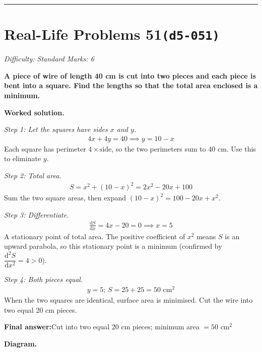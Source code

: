 \documentclass[11pt]{article}
\newcommand{\question}[1]{\par\medskip\noindent\textbf{#1}\par}
\begin{document}
\medskip\hrule

\section*{Real-Life Problems 51\quad\small\texttt{(d5-051)}}
\textit{Difficulty: Standard \quad\textbar\quad Marks: 6}

\question{A piece of wire of length 40 cm is cut into two pieces and each piece is bent into a square. Find the lengths so that the total area enclosed is a minimum.}

\textbf{Worked solution.}

\textit{Step 1: Let the squares have sides \( x \) and \( y \).}
\[\begin{gathered}
4x + 4y = 40 \implies y = 10 - x
\end{gathered}\]
Each square has perimeter \( 4 \times \text{side} \), so the two perimeters sum to 40 cm. Use this to eliminate \( y \).

\textit{Step 2: Total area.}
\[\begin{gathered}
S = x^2 + (10 - x)^2 = 2x^2 - 20x + 100
\end{gathered}\]
Sum the two square areas, then expand \( (10-x)^2 = 100 - 20x + x^2 \).

\textit{Step 3: Differentiate.}
\[\begin{gathered}
\frac{\mathrm{d}S}{\mathrm{d}x} = 4x - 20 = 0 \implies x = 5
\end{gathered}\]
A stationary point of total area. The positive coefficient of \( x^2 \) means \( S \) is an upward parabola, so this stationary point is a minimum (confirmed by \( \dfrac{\mathrm{d}^2 S}{\mathrm{d}x^2} = 4 > 0 \)).

\textit{Step 4: Both pieces equal.}
\[\begin{gathered}
y = 5; \, S = 25 + 25 = 50 \text{ cm}^2
\end{gathered}\]
When the two squares are identical, surface area is minimised. Cut the wire into two equal 20 cm pieces.

\begin{answerbox}
\textbf{Final answer:}\quad Cut into two equal 20 cm pieces; minimum area \(\displaystyle  = 50 \text{ cm}^2 \)
\end{answerbox}
\textbf{Diagram.}
\end{document}
